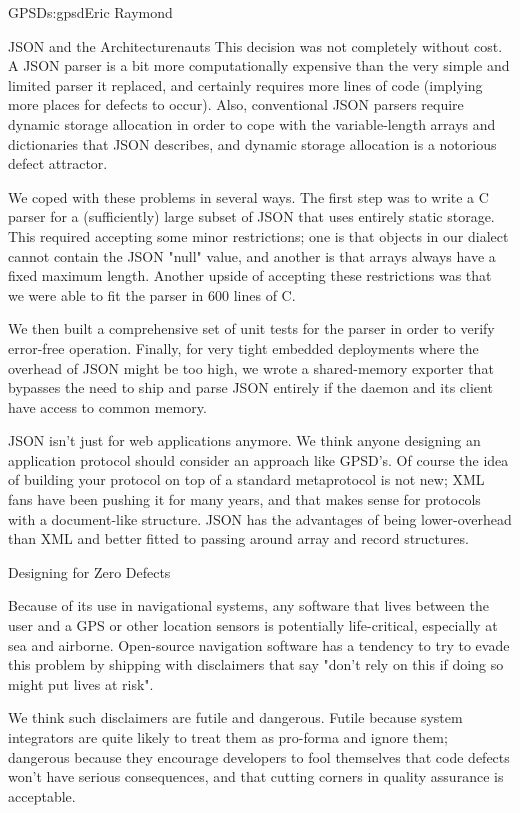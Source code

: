 \begin{aosachapter}{GPSD}{s:gpsd}{Eric Raymond}
\begin{aosasect1}{JSON and the Architecturenauts}
This decision was not completely without cost.  A JSON parser is a bit
more computationally expensive than the very simple and limited parser it
replaced, and certainly requires more lines of code (implying more
places for defects to occur). Also, conventional JSON parsers require
dynamic storage allocation in order to cope with the variable-length
arrays and dictionaries that JSON describes, and dynamic storage
allocation is a notorious defect attractor.

We coped with these problems in several ways. The first step was to
write a C parser for a (sufficiently) large subset of JSON that uses
entirely static storage.  This required accepting some minor
restrictions; one is that objects in our dialect cannot contain the
JSON "null" value, and another is that arrays always have a fixed
maximum length.  Another upside of accepting these restrictions 
was that we were able to fit the parser in 600 lines of C.

We then built a comprehensive set of unit tests for the parser 
in order to verify error-free operation. Finally, for very tight
embedded deployments where the overhead of JSON might be too high,
we wrote a shared-memory exporter that bypasses the need to
ship and parse JSON entirely if the daemon and its client have
access to common memory.

JSON isn't just for web applications anymore.  We think anyone
designing an application protocol should consider an approach like
GPSD's.  Of course the idea of building your protocol on top of a
standard metaprotocol is not new; XML fans have been pushing it for
many years, and that makes sense for protocols with a document-like
structure. JSON has the advantages of being lower-overhead than XML
and better fitted to passing around array and record structures.

\end{aosasect1}

\begin{aosasect1}{Designing for Zero Defects}

Because of its use in navigational systems, any software that lives
between the user and a GPS or other location sensors is potentially
life-critical, especially at sea and airborne.  Open-source navigation
software has a tendency to try to evade this problem by shipping with
disclaimers that say "don't rely on this if doing so might put lives
at risk".

We think such disclaimers are futile and dangerous.  Futile because
system integrators are quite likely to treat them as pro-forma and
ignore them; dangerous because they encourage developers to fool
themselves that code defects won't have serious consequences, and
that cutting corners in quality assurance is acceptable.


\end{aosasect1}
\end{aosachapter}

